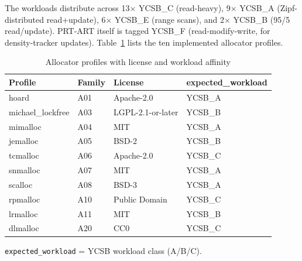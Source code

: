 The workloads distribute across 13$\times$ YCSB\_C (read-heavy), 9$\times$ YCSB\_A (Zipf-distributed
read+update), 6$\times$ YCSB\_E (range scans), and 2$\times$ YCSB\_B (95/5 read/update). PRT-ART
itself is tagged YCSB\_F (read-modify-write, for density-tracker updates).
Table~\ref{tab:allocator-profiles} lists the ten implemented allocator profiles.

\begin{table}[!htbp]
  \caption{Allocator profiles with license and workload affinity}\label{tab:allocator-profiles}
  \centering\small
  \begin{tabular}{llll}
    \toprule
    \textbf{Profile} & \textbf{Family} & \textbf{License} & \textbf{expected\_workload} \\
    \midrule
    hoard & A01 & Apache-2.0 & YCSB\_A \\
    michael\_lockfree & A03 & LGPL-2.1-or-later & YCSB\_B \\
    mimalloc & A04 & MIT & YCSB\_A \\
    jemalloc & A05 & BSD-2 & YCSB\_B \\
    tcmalloc & A06 & Apache-2.0 & YCSB\_C \\
    snmalloc & A07 & MIT & YCSB\_A \\
    scalloc & A08 & BSD-3 & YCSB\_A \\
    rpmalloc & A10 & Public Domain & YCSB\_C \\
    lrmalloc & A11 & MIT & YCSB\_B \\
    dlmalloc & A20 & CC0 & YCSB\_C \\
    \bottomrule
  \end{tabular}

  \smallskip
  {\footnotesize \texttt{expected\_workload} = YCSB workload class (A/B/C).\par}
\end{table}

